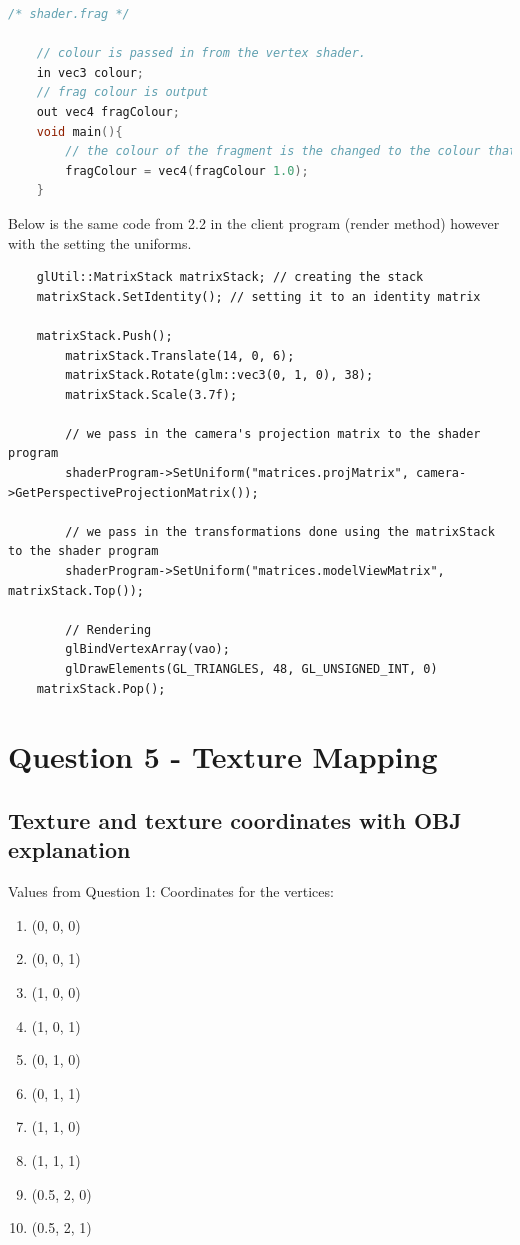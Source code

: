 \documentclass[10pt]{report}
\begin{document}
\begin{lstlisting}[language = c]
/* shader.frag */ 

    // colour is passed in from the vertex shader.
    in vec3 colour;
    // frag colour is output
    out vec4 fragColour;
    void main(){
        // the colour of the fragment is the changed to the colour that is passed in via the client via the vertex shader
        fragColour = vec4(fragColour 1.0);
    }

\end{lstlisting}

Below is the same code from 2.2 in the client program (render method) however with the setting the  uniforms.

\begin{lstlisting}
    glUtil::MatrixStack matrixStack; // creating the stack
    matrixStack.SetIdentity(); // setting it to an identity matrix

    matrixStack.Push();
        matrixStack.Translate(14, 0, 6);
        matrixStack.Rotate(glm::vec3(0, 1, 0), 38);
        matrixStack.Scale(3.7f);

        // we pass in the camera's projection matrix to the shader program
        shaderProgram->SetUniform("matrices.projMatrix", camera->GetPerspectiveProjectionMatrix());

        // we pass in the transformations done using the matrixStack to the shader program
        shaderProgram->SetUniform("matrices.modelViewMatrix", matrixStack.Top());

        // Rendering 
        glBindVertexArray(vao);
        glDrawElements(GL_TRIANGLES, 48, GL_UNSIGNED_INT, 0)
    matrixStack.Pop();

\end{lstlisting}


\chapter{Question 5 - Texture Mapping}

\section{Texture and texture coordinates with OBJ explanation}

Values from Question 1:
Coordinates for the vertices:
\begin{enumerate}[(1)]
    \item (0, 0, 0) %
    \item (0, 0, 1) %
    \item (1, 0, 0) %
    \item (1, 0, 1) %
    \item (0, 1, 0) %
    \item (0, 1, 1) %
    \item (1, 1, 0) %
    \item (1, 1, 1) %
    \item (0.5, 2, 0) %
    \item (0.5, 2, 1) %
\end{enumerate}
\end{document}
